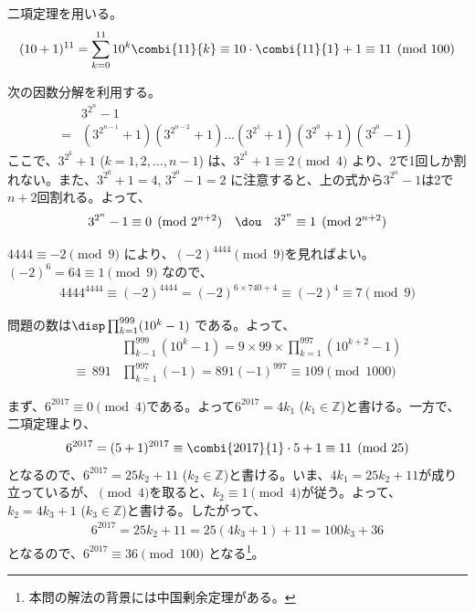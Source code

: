 二項定理を用いる。
\begin{align*}
 (10+1)^{11}=\sum_{k=0}^{11}10^k \combi{11}{k}\equiv 10\cdot\combi{11}{1}+1\equiv 11 \pmod{100}
\end{align*}

次の因数分解を利用する。
\begin{align*}
 &3^{2^n}-1 \\
=&\left(3^{2^{n-1}}+1\right)\left(3^{2^{n-2}}+1\right)\dots\left(3^{2^1}+1\right)\left(3^{2^0}+1\right)\left(3^{2^0}-1\right)
\end{align*}
ここで、$3^{2^k}+1$ ($k=1, 2, \dots , n-1$) は、$3^{2^k}+1\equiv 2 \pmod{4}$ より、2で1回しか割れない。また、$3^{2^0}+1=4$, $3^{2^0}-1=2$ に注意すると、上の式から$3^{2^n}-1$は2で$n+2$回割れる。よって、
\[ 3^{2^n}-1\equiv 0 \pmod{2^{n+2}} \quad\dou\quad 3^{2^n}\equiv 1 \pmod{2^{n+2}} \]

$4444\equiv -2 \pmod{9}$ により、$(-2)^{4444} \pmod{9}$を見ればよい。$(-2)^6=64\equiv 1 \pmod{9}$ なので、
\begin{align*}
 4444^{4444}\equiv (-2)^{4444}=(-2)^{6\times 740+4}\!\equiv (-2)^4\equiv 7 \pmod{9}
\end{align*}

問題の数は$\disp \prod_{k=1}^{999} (10^k-1)$ である。よって、
\begin{align*}
 &\prod_{k-1}^{999}(10^k-1)=9\times 99\times \prod_{k=1}^{997}(10^{k+2}-1) \\
 \equiv \, 891&\prod_{k=1}^{997}(-1)=891(-1)^{997}\equiv 109 \pmod{1000}
\end{align*}

まず、$6^{2017}\equiv 0 \pmod{4}$である。よって$6^{2017}=4k_1$ ($k_1\in \mathbb{Z}$)と書ける。一方で、二項定理より、
\begin{align*}
 6^{2017}=(5+1)^{2017}\equiv \combi{2017}{1}\cdot 5 + 1 \equiv 11 \pmod{25}
\end{align*}
となるので、$6^{2017}=25k_2+11$ ($k_2\in \mathbb{Z}$)と書ける。いま、$4k_1=25k_2+11$が成り立っているが、$\pmod{4}$を取ると、$k_2\equiv 1 \pmod{4}$が従う。よって、$k_2=4k_3+1$ ($k_3\in \mathbb{Z}$)と書ける。したがって、
\begin{align*}
 6^{2017}=25k_2+11=25(4k_3+1)+11=100k_3+36
\end{align*}
となるので、$6^{2017}\equiv 36 \pmod{100}$ となる\footnote{本問の解法の背景には中国剰余定理がある。}。

